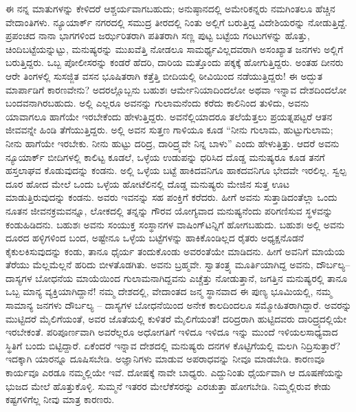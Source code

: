ಈ ನನ್ನ ಮಾತುಗಳನ್ನು ಕೇಳಿದರೆ ಆಶ್ಚರ್ಯವಾಗಬಹುದು; ಅನುಷ್ಠಾನದಲ್ಲಿ ಅಮೇರಿಕನ್ನರು ನಮಗಿಂತಲೂ ಹೆಚ್ಚಿನ ವೇದಾಂತಿಗಳು. ನ್ಯೂಯಾರ್ಕ್​ ನಗರದಲ್ಲಿ ಸಮುದ್ರ ತೀರದಲ್ಲಿ ನಿಂತು ಅಲ್ಲಿಗೆ ಬರುತ್ತಿದ್ದ ವಿದೇಶಿಯರನ್ನು ನೋಡುತ್ತಿದ್ದೆ. ಪ್ರಪಂಚದ ನಾನಾ ಭಾಗಗಳಿಂದ ಜರ್ಝರಿತರಾಗಿ ಪತಿತರಾಗಿ ಸಣ್ಣ ಪುಟ್ಟ ಬಟ್ಟೆಯ ಗಂಟುಗಳನ್ನು ಹೊತ್ತು, ಚಿಂದಿಬಟ್ಟೆಯನ್ನುಟ್ಟು, ಮನುಷ್ಯರನ್ನು ಮುಖವೆತ್ತಿ ನೋಡಲೂ ಸಾಮರ್ಥ್ಯವಿಲ್ಲದವರಾಗಿ ಅಸಂಖ್ಯಾತ ಜನಗಳು ಅಲ್ಲಿಗೆ ಬರುತ್ತಿದ್ದರು. ಒಬ್ಬ ಪೋಲೀಸರನ್ನು ಕಂಡರೆ ಹೆದರಿ, ದಾರಿಯ ಮತ್ತೊಂದು ಪಕ್ಕಕ್ಕೆ ಹೋಗುತ್ತಿದ್ದರು. ಅಂತಹ ದೀನರು ಆರೇ ತಿಂಗಳಲ್ಲಿ ಸುಸಜ್ಜಿತ ವಸನ ಭೂಷಿತರಾಗಿ ಕತ್ತೆತ್ತಿ ಬೀದಿಯಲ್ಲಿ ಠೀವಿಯಿಂದ ನಡೆಯುತ್ತಿದ್ದರು! ಈ ಅದ್ಭುತ ಮಾರ್ಪಾಡಿಗೆ ಕಾರಣವೇನು? ಅದರಲ್ಲೊಬ್ಬನು ಬಹುಶಃ ಆರ್ಮೇನಿಯಾದಿಂದಲೋ ಅಥವಾ ಇನ್ನಾವ ದೇಶದಿಂದಲೋ ಬಂದವನಾಗಿರಬಹುದು. ಅಲ್ಲಿ ಎಲ್ಲರೂ ಅವನನ್ನು ಗುಲಾಮನೆಂದು ಕರೆದು ಕಾಲಿನಿಂದ ತುಳಿದು, ಅವನು ಯಾವಾಗಲೂ ಹಾಗೆಯೇ ಇರಬೇಕೆಂದು ಹೇಳುತ್ತಿದ್ದರು. ಅವನೆಲ್ಲಿಯಾದರೂ ತಲೆಯೆತ್ತಲು ಪ್ರಯತ್ನಪಟ್ಟರೆ ಆತನ ಜೀವವನ್ನೇ ಹಿಂಡಿ ತೆಗೆಯುತ್ತಿದ್ದರು. ಅಲ್ಲಿ ಅವನ ಸುತ್ತಣ ಗಾಳಿಯೂ ಕೂಡ “ನೀನು ಗುಲಾಮ, ಹುಟ್ಟುಗುಲಾಮ; ನೀನು ಹಾಗೆಯೇ ಇರಬೇಕು. ನೀನು ಹುಟ್ಟು ದರಿದ್ರ, ದಾರಿದ್ರ್ಯವೇ ನಿನ್ನ ಬಾಳು” ಎಂದು ಹೇಳುತ್ತಿತ್ತು. ಆದರೆ ಅವನು ನ್ಯೂಯಾರ್ಕ್​ ಬೀದಿಗಳಲ್ಲಿ ಕಾಲಿಟ್ಟ ಕೂಡಲೆ, ಒಳ್ಳೆಯ ಉಡುಪನ್ನು ಧರಿಸಿದ ದೊಡ್ಡ ಮನುಷ್ಯರೂ ಕೂಡ ತನಗೆ ಹಸ್ತಲಾಘವ ಕೊಡುವುದನ್ನು ಕಂಡನು. ಅಲ್ಲಿ ಒಳ್ಳೆಯ ಬಟ್ಟೆ ಹಾಕಿದವನಿಗೂ ಹಾಕದವನಿಗೂ ಭೇದವೇ ಇರಲಿಲ್ಲ. ಸ್ವಲ್ಪ ದೂರ ಹೋದ ಮೇಲೆ ಒಂದು ಒಳ್ಳೆಯ ಹೋಟೆಲಿನಲ್ಲಿ ದೊಡ್ಡ ಮನುಷ್ಯರು ಮೇಜಿನ ಸುತ್ತ ಊಟ ಮಾಡುತ್ತಿರುವುದನ್ನು ಕಂಡನು. ಅವರು ಇವನನ್ನು ಸಹ ಪಂಕ್ತಿಗೆ ಕರೆದರು. ಹೀಗೆ ಅವನು ಸುತ್ತಾಡಿದಂತೆಲ್ಲಾ ಒಂದು ನೂತನ ಜೀವನಕ್ರಮವನ್ನೂ, ಲೋಕದಲ್ಲಿ ತನ್ನನ್ನು ಗೌರವ ಯೋಗ್ಯವಾದ ಮನುಷ್ಯನೆಂದು ಪರಿಗಣಿಸುವ ಸ್ಥಳವನ್ನು ಕಂಡುಹಿಡಿದನು. ಬಹುಶಃ ಅವನು ಸಂಯುಕ್ತ ಸಂಸ್ಥಾನಗಳ ವಾಷಿಂಗ್​ಟನ್ನಿಗೆ ಹೋಗಬಹುದು. ಬಹುಶಃ ಅಲ್ಲಿ ಅವನು ದೂರದ ಹಳ್ಳಿಗಳಿಂದ ಬಂದ, ಅಷ್ಟೇನೂ ಒಳ್ಳೆಯ ಬಟ್ಟೆಗಳನ್ನು ಹಾಕಿಕೊಂಡಿಲ್ಲದ ರೈತರು ಅಧ್ಯಕ್ಷನೊಡನೆ ಕೈಕುಲಕಿಸುವುದನ್ನು ಕಂಡು, ತಾನೂ ಧೈರ್ಯ ತಂದುಕೊಂಡು ಅವರಂತೆಯೇ ಮಾಡಿದನು. ಹೀಗೆ ಅವನಿಗೆ ಮಾಯೆಯ ತೆರೆಯು ಮೆಲ್ಲಮೆಲ್ಲನೆ ಹರಿದು ಬೀಳತೊಡಗಿತು. ಅವನು ಬ್ರಹ್ಮವೇ. ಸ್ವಾತಂತ್ರ್ಯ ಮೂರ್ತಿಯಾಗಿದ್ದ ಅವನು, ದೌರ್ಬಲ್ಯ–ದಾಸ್ಯಗಳ ಬೋಧನೆಯ ಮಾಯೆಯಿಂದ ಗುಲಾಮನಾಗಿದ್ದವನು ಎಚ್ಚೆತ್ತು ನೋಡುತ್ತಾನೆ, ಜಗತ್ತಿನ ಮನುಷ್ಯರಲ್ಲಿ ತಾನೂ ಒಬ್ಬ ಮಾನ್ಯ ವ್ಯಕ್ತಿಯಾಗಿದ್ದಾನೆ! ನಮ್ಮ ದೇಶದಲ್ಲಿ, ವೇದಾಂತದ ಜನ್ಮ ಸ್ಥಾನವಾದ ಈ ಪುಣ್ಯ ಭೂಮಿಯಲ್ಲಿ, ನಮ್ಮ ಸಾಮಾನ್ಯ ಜನಗಳು ದೌರ್ಬಲ್ಯ – ದಾಸ್ಯಗಳ ಬೋಧನೆಯಿಂದ ಅನೇಕ ಕಾಲದಿಂದಲೂ ಸಮ್ಮೋಹಿತರಾಗಿದ್ದಾರೆ. ಅವರನ್ನು ಮುಟ್ಟಿದರೆ ಮೈಲಿಗೆಯಂತೆ, ಅವರ ಜೊತೆಯಲ್ಲಿ ಕುಳಿತರೆ ಮೈಲಿಗೆಯಂತೆ! ದರಿದ್ರರಾಗಿ ಹುಟ್ಟಿದವರು ದಾರಿದ್ರ್ಯದಲ್ಲಿಯೇ ಇರಬೇಕಂತೆ. ಪರಿಪೂರ್ಣವಾಗಿ ಅವರೆಲ್ಲರೂ ಅಧೋಗತಿಗೆ ಇಳಿದೂ ಇಳಿದೂ ಇನ್ನು ಮುಂದೆ ಇಳಿಯಲಸಾಧ್ಯವಾದ ಸ್ಥಿತಿಗೆ ಬಂದು ಬಿಟ್ಟಿದ್ದಾರೆ. ಏಕೆಂದರೆ ಇನ್ನಾವ ದೇಶದಲ್ಲಿ ಮನುಷ್ಯರು ದನಗಳ ಕೊಟ್ಟಿಗೆಯಲ್ಲಿ ಮಲಗಿ ನಿದ್ರಿಸುತ್ತಾರೆ? ಇದಕ್ಕಾಗಿ ಯಾರನ್ನೂ ದೂಷಿಸಬೇಡಿ. ಅಜ್ಞಾನಿಗಳು ಮಾಡುವ ಅಪರಾಧವನ್ನು ನೀವೂ ಮಾಡಬೇಡಿ. ಕಾರಣವೂ ಕಾರ್ಯವೂ ಎರಡೂ ನಮ್ಮಲ್ಲಿಯೇ ಇವೆ. ದೋಷಕ್ಕೆ ನಾವೇ ಬಾಧ್ಯರು. ಎದ್ದುನಿಂತು ಧೈರ್ಯವಾಗಿ ಆ ದೂಷಣೆಯನ್ನು ಭುಜದ ಮೇಲೆ ಹೊತ್ತುಕೊಳ್ಳಿ. ಸುಮ್ಮನೆ ಇತರರ ಮೇಲೆ\break ಕೆಸರನ್ನು ಎರಚುತ್ತಾ ಹೋಗಬೇಡಿ. ನಿಮ್ಮಲ್ಲಿರುವ ಕೇಡು ಕಷ್ಟಗಳಿಗೆಲ್ಲ ನೀವು ಮಾತ್ರ ಕಾರಣರು.

